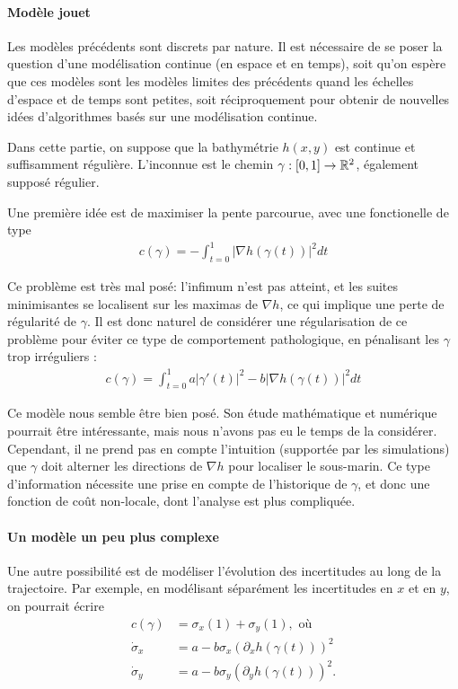\paragraph{Modèle jouet}
Les modèles précédents sont discrets par nature. Il est nécessaire de
se poser la question d'une modélisation continue (en espace et en
temps), soit qu'on espère que ces modèles sont les modèles limites des
précédents quand les échelles d'espace et de temps sont petites, soit
réciproquement pour obtenir de nouvelles idées d'algorithmes basés sur
une modélisation continue.

Dans cette partie, on suppose que la bathymétrie $h(x,y)$ est continue
et suffisamment régulière. L'inconnue est le chemin $\gamma : [0,1]
\to \mathbb{R}^{2}$, également supposé régulier.

Une première idée est de maximiser la pente parcourue, avec une
fonctionelle de type
  \begin{align*}
    c(\gamma) = -\int_{t=0}^{1} |\nabla h(\gamma(t))|^{2}  dt
  \end{align*}

  Ce problème est très mal posé: l'infimum n'est pas atteint, et les
  suites minimisantes se localisent sur les maximas de $\nabla h$, ce
  qui implique une perte de régularité de $\gamma$. Il
  est donc naturel de considérer une régularisation de ce problème
  pour éviter ce type de comportement pathologique, en pénalisant les
  $\gamma$ trop irréguliers :
\begin{align*}
  c(\gamma) =  \int_{t=0}^{1} a |\gamma'(t)|^{2} - b |\nabla
  h(\gamma(t))|^{2} dt
\end{align*}

Ce modèle nous semble être bien posé. Son étude mathématique et
numérique pourrait être intéressante, mais nous n'avons pas eu le
temps de la considérer. Cependant, il ne prend pas en compte
l'intuition (supportée par les simulations) que $\gamma$ doit alterner
les directions de $\nabla h$ pour localiser le sous-marin. Ce type
d'information nécessite une prise en compte de l'historique de
$\gamma$, et donc une fonction de coût non-locale, dont l'analyse est
plus compliquée.

\paragraph{Un modèle un peu plus complexe}
Une autre possibilité est de modéliser l'évolution des incertitudes au
long de la trajectoire. Par exemple, en modélisant séparément les
incertitudes en $x$ et en $y$, on pourrait écrire
\begin{align*}
  c(\gamma) &= \sigma_{x}(1) + \sigma_{y}(1), \text{ où}\\
  \dot \sigma_{x} &= a - b \sigma_{x} (\partial_{x} h(\gamma(t)))^{2}\\
  \dot \sigma_{y} &= a - b \sigma_{y} (\partial_{y} h(\gamma(t)))^{2}.
\end{align*}

